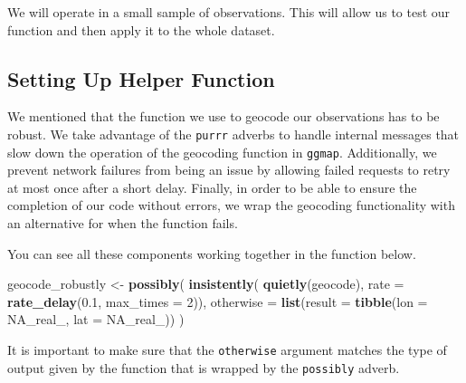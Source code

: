 \documentclass[12pt,twoside]{amherstthesis}
\newenvironment{Shaded}{\begin{snugshade}}{\end{snugshade}}
\newcommand{\KeywordTok}[1]{\textcolor[rgb]{0.13,0.29,0.53}{\textbf{#1}}}
\newcommand{\DataTypeTok}[1]{\textcolor[rgb]{0.13,0.29,0.53}{#1}}
\newcommand{\DecValTok}[1]{\textcolor[rgb]{0.00,0.00,0.81}{#1}}
\newcommand{\FloatTok}[1]{\textcolor[rgb]{0.00,0.00,0.81}{#1}}
\newcommand{\StringTok}[1]{\textcolor[rgb]{0.31,0.60,0.02}{#1}}
\newcommand{\OtherTok}[1]{\textcolor[rgb]{0.56,0.35,0.01}{#1}}
\newcommand{\OperatorTok}[1]{\textcolor[rgb]{0.81,0.36,0.00}{\textbf{#1}}}
\newcommand{\NormalTok}[1]{#1}
\begin{document}
We will operate in a small sample of observations. This will allow us to
test our function and then apply it to the whole dataset.
\begin{Shaded}
\end{Shaded}
\subsection{Setting Up Helper
Function}\label{setting-up-helper-function}

We mentioned that the function we use to geocode our observations has to
be robust. We take advantage of the \texttt{purrr} adverbs to handle
internal messages that slow down the operation of the geocoding function
in \texttt{ggmap}. Additionally, we prevent network failures from being
an issue by allowing failed requests to retry at most once after a short
delay. Finally, in order to be able to ensure the completion of our code
without errors, we wrap the geocoding functionality with an alternative
for when the function fails.

You can see all these components working together in the function below.
\begin{Shaded}
\begin{Highlighting}[]
\NormalTok{geocode_robustly <-}
\StringTok{    }\KeywordTok{possibly}\NormalTok{(}
        \KeywordTok{insistently}\NormalTok{(}
            \KeywordTok{quietly}\NormalTok{(geocode),}
            \DataTypeTok{rate =} \KeywordTok{rate_delay}\NormalTok{(}\FloatTok{0.1}\NormalTok{, }\DataTypeTok{max_times =} \DecValTok{2}\NormalTok{)),}
        \DataTypeTok{otherwise =} \KeywordTok{list}\NormalTok{(}\DataTypeTok{result =} \KeywordTok{tibble}\NormalTok{(}\DataTypeTok{lon =} \OtherTok{NA_real_}\NormalTok{, }\DataTypeTok{lat =} \OtherTok{NA_real_}\NormalTok{))}
\NormalTok{    )}
\end{Highlighting}
\end{Shaded}
It is important to make sure that the \texttt{otherwise} argument
matches the type of output given by the function that is wrapped by the
\texttt{possibly} adverb.
\end{document}
